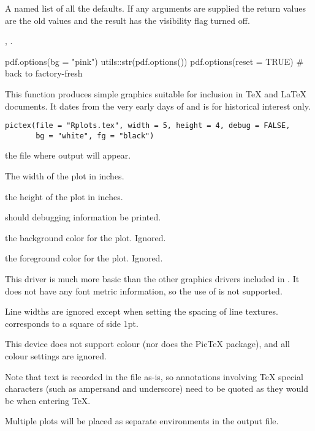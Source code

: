 %
\begin{Value}
A named list of all the defaults.  If any arguments are
supplied the return values are the old values and the result has the
visibility flag turned off.
\end{Value}
%
\begin{SeeAlso}\relax
{}, .
\end{SeeAlso}
%
\begin{Examples}
\begin{ExampleCode}
pdf.options(bg = "pink")
utils::str(pdf.options())
pdf.options(reset = TRUE) # back to factory-fresh
\end{ExampleCode}
\end{Examples}
%
\begin{Description}\relax
This function produces simple graphics suitable for inclusion in TeX
and LaTeX documents.  It dates from the very early days of \R{} and is
for historical interest only.
\end{Description}
%
\begin{Usage}
\begin{verbatim}
pictex(file = "Rplots.tex", width = 5, height = 4, debug = FALSE,
       bg = "white", fg = "black")
\end{verbatim}
\end{Usage}
%
\begin{Arguments}
\begin{ldescription}
\item[\code{file}] the file where output will appear.
\item[\code{width}] The width of the plot in inches.
\item[\code{height}] the height of the plot in inches.
\item[\code{debug}] should debugging information be printed.
\item[\code{bg}] the background color for the plot.  Ignored.
\item[\code{fg}] the foreground color for the plot.  Ignored.
\end{ldescription}
\end{Arguments}
%
\begin{Details}\relax
This driver is much more basic than the other graphics drivers
included in \R{}.  It does not have any font metric information, so the
use of  is not supported.

Line widths are ignored except when setting the spacing of line textures.
 corresponds to a square of side 1pt.

This device does not support colour (nor does the PicTeX package),
and all colour settings are ignored.

Note that text is recorded in the file as-is, so annotations involving
TeX special characters (such as ampersand and underscore) need to be
quoted as they would be when entering TeX.

Multiple plots will be placed as separate environments in the output file.  
\end{Details}
